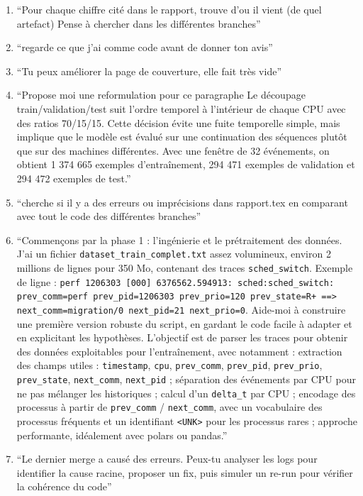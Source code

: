 \documentclass[letterpaper, 10 pt, conference]{ieeeconf}  %
\begin{document}
\begin{enumerate}
    \item ``Pour chaque chiffre cité dans le rapport, trouve d'ou il vient (de quel artefact) Pense à chercher dans les différentes branches''
    \item ``regarde ce que j'ai comme code avant de donner ton avis''
    \item ``Tu peux améliorer la page de couverture, elle fait très vide''
    \item ``Propose moi une reformulation pour ce paragraphe Le découpage train/validation/test suit l’ordre temporel à l’intérieur de chaque CPU avec des ratios 70/15/15. Cette décision évite une fuite temporelle simple, mais implique que le modèle est évalué sur une continuation des séquences plutôt que sur des machines différentes. Avec une fenêtre de 32 événements, on obtient 1 374 665 exemples d’entraînement, 294 471 exemples de validation et 294 472 exemples de test.''
    \item ``cherche si il y a des erreurs ou imprécisions dans rapport.tex en comparant avec tout le code des différentes branches''
    \item ``Commençons par la phase 1 : l’ingénierie et le prétraitement des données. J’ai un fichier \texttt{dataset\_train\_complet.txt} assez volumineux, environ 2 millions de lignes pour 350 Mo, contenant des traces \texttt{sched\_switch}. Exemple de ligne : \texttt{perf 1206303 [000] 6376562.594913: sched:sched\_switch: prev\_comm=perf prev\_pid=1206303 prev\_prio=120 prev\_state=R+ ==> next\_comm=migration/0 next\_pid=21 next\_prio=0}. Aide-moi à construire une première version robuste du script, en gardant le code facile à adapter et en explicitant les hypothèses. L’objectif est de parser les traces pour obtenir des données exploitables pour l’entraînement, avec notamment : extraction des champs utiles : \texttt{timestamp}, \texttt{cpu}, \texttt{prev\_comm}, \texttt{prev\_pid}, \texttt{prev\_prio}, \texttt{prev\_state}, \texttt{next\_comm}, \texttt{next\_pid} ; séparation des événements par CPU pour ne pas mélanger les historiques ; calcul d’un \texttt{delta\_t} par CPU ; encodage des processus à partir de \texttt{prev\_comm} / \texttt{next\_comm}, avec un vocabulaire des processus fréquents et un identifiant \texttt{<UNK>} pour les processus rares ; approche performante, idéalement avec polars ou pandas.''
    \item ``Le dernier merge a causé des erreurs. Peux-tu analyser les logs pour identifier la cause racine, proposer un fix, puis simuler un re-run pour vérifier la cohérence du code''
\end{enumerate}
\end{document}

